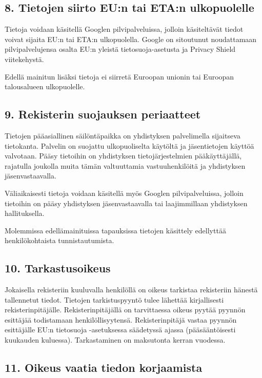 \documentclass[finnish]{tktltiki}
\begin{document}
\subsection*{8. Tietojen siirto EU:n tai ETA:n ulkopuolelle}

Tietoja voidaan käsitellä Googlen pilvipalveluissa, jolloin käsiteltävät tiedot voivat sijaita EU:n tai ETA:n ulkopuolella. Google on sitoutunut noudattamaan pilvipalvelujensa osalta EU:n yleistä tietosuoja-asetusta ja Privacy Shield viitekehystä.

Edellä mainitun lisäksi tietoja ei siirretä Euroopan unionin tai Euroopan talousalueen ulkopuolelle.

\subsection*{9. Rekisterin suojauksen periaatteet}

Tietojen pääasiallinen säilöntäpaikka on yhdistyksen palvelimella sijaitseva tietokanta. Palvelin on suojattu ulkopuoliselta käytöltä ja jäsentietojen käyttöä valvotaan. Pääsy tietoihin on yhdistyksen tietojärjestelmien pääkäyttäjällä, rajatulla joukolla muita tämän valtuuttamia vastuuhenkilöitä ja yhdistyksen jäsenvastaavalla.

Väliaikaisesti tietoja voidaan käsitellä myös Googlen pilvipalveluissa, jolloin tietoihin on pääsy yhdistyksen jäsenvastaavalla tai laajimmillaan yhdistyksen hallituksella.

Molemmissa edellämainituissa tapauksissa tietojen käsittely edellyttää henkilökohtaista tunnistautumista.

\subsection*{10. Tarkastusoikeus}

Jokaisella rekisteriin kuuluvalla henkilöllä on oikeus tarkistaa rekisteriin hänestä tallennetut tiedot. Tietojen tarkistuspyyntö tulee lähettää kirjallisesti rekisterinpitäjälle. Rekisterinpitäjällä on tarvittaessa oikeus pyytää pyynnön esittäjää todistamaan henkilöllisyytensä. Rekisterinpitäjä vastaa pyynnön esittäjälle EU:n tietosuoja -asetuksessa säädetyssä ajassa (pääsääntöisesti kuukauden kuluessa). Tarkastaminen on maksutonta kerran vuodessa.

\subsection*{11. Oikeus vaatia tiedon korjaamista}
\end{document}

